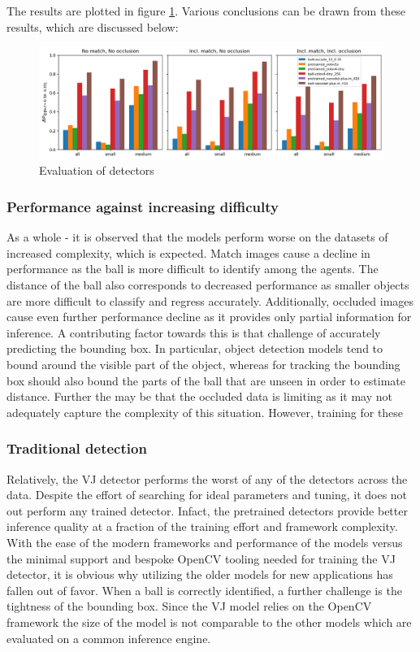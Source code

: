 \documentclass[a4paper,twoside,12pt]{report}
\begin{document}
The results are plotted in figure \ref{fig:evaldetect}. Various conclusions can be drawn from these results, which are discussed below:

\begin{figure}[h!]
\begin{center}
\includegraphics[width=15.5cm]{images/eval_detect.png}
\caption{Evaluation of detectors}
\label{fig:evaldetect}
\end{center}
\end{figure}

\subsubsection{Performance against increasing difficulty}

As a whole - it is observed that the models perform worse on the datasets of increased complexity, which is expected. Match images cause a decline in performance as the ball is more difficult to identify among the agents. The distance of the ball also corresponds to decreased performance as smaller objects are more difficult to classify and regress accurately. Additionally, occluded images cause even further performance decline as it provides only partial information for inference. A contributing factor towards this is that challenge of accurately predicting the bounding box. In particular, object detection models tend to bound around the visible part of the object, whereas for tracking the bounding box should also bound the parts of the ball that are unseen in order to estimate distance. Further the may be that the occluded data is limiting as it may not adequately capture the complexity of this situation. However, training for these 

\subsubsection{Traditional detection}

Relatively, the VJ detector performs the worst of any of the detectors across the data. Despite the effort of searching for ideal parameters and tuning, it does not out perform any trained detector. Infact, the pretrained detectors provide better inference quality at a fraction of the training effort and framework complexity. With the ease of the modern frameworks and performance of the models versus the minimal support and bespoke OpenCV tooling needed for training the VJ detector, it is obvious why utilizing the older models for new applications has fallen out of favor. When a ball is correctly identified, a further challenge is the tightness of the bounding box. Since the VJ model relies on the OpenCV framework the size of the model is not comparable to the other models which are evaluated on a common inference engine.
\end{document}
